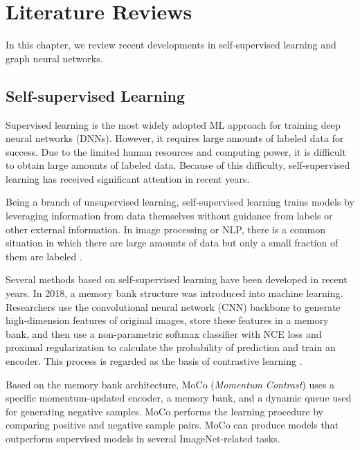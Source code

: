 

\section{Literature Reviews}\label{sec:2}

In this chapter, we review recent developments in self-supervised learning and graph neural networks.  


\subsection{Self-supervised Learning}

Supervised learning is the most widely adopted ML approach for training deep neural networks (DNNs). However, it requires large amounts of labeled data for success. Due to the limited human resources and computing power, it is difficult to obtain large amounts of labeled data. Because of this difficulty, self-supervised learning has received significant attention in recent years. 

Being a branch of unsupervised learning, self-supervised learning trains models by leveraging information from data themselves without guidance from labels or other external information. In image processing or NLP, there is a common situation in which there are large amounts of data but only a small fraction of them are labeled \cite{zhu2021empirical}. 

Several methods based on self-supervised learning have been developed in recent years. In 2018, a memory bank \cite{MemoryBank} structure was introduced into machine learning. Researchers use the convolutional neural network (CNN) backbone to generate high-dimension features of original images, store these features in a memory bank, and then use a non-parametric softmax classifier with NCE loss and proximal regularization to calculate the probability of prediction and train an encoder. This process is regarded as the basis of contrastive learning \cite{hassani2020contrastive}.



Based on the memory bank architecture, MoCo (\textit{Momentum Contrast}) \cite{MoCo, MoCov2} uses a specific momentum-updated encoder, a memory bank, and a dynamic queue used for generating negative samples. MoCo performs the learning procedure by comparing positive and negative sample pairs. MoCo can produce models that outperform supervised models in several ImageNet-related tasks. 



